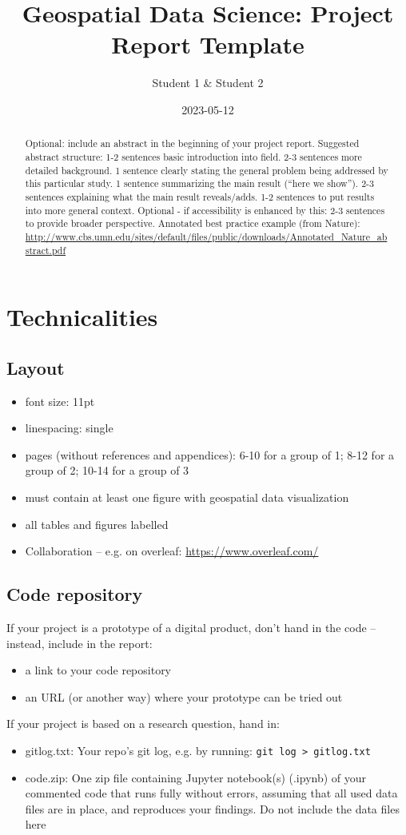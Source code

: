 \documentclass{article}
\title{Geospatial Data Science: Project Report Template}
\author{Student 1 \& Student 2}
\date{2023-05-12}
\begin{document}
\maketitle

\begin{abstract}
Optional: include an abstract in the beginning of your project report. Suggested abstract structure: 1-2 sentences basic introduction into field. 2-3 sentences more detailed background. 1 sentence clearly stating the general problem being addressed by this particular study. 1 sentence summarizing the main result (“here we show”). 2-3 sentences explaining what the main result reveals/adds. 1-2 sentences to put results into more general context. Optional - if accessibility is enhanced by this: 2-3 sentences to provide broader perspective. Annotated best practice example (from Nature): \url{http://www.cbs.umn.edu/sites/default/files/public/downloads/Annotated_Nature_abstract.pdf}
\end{abstract}

\section*{Technicalities}
\subsection*{Layout}
\begin{itemize}
	\item font size: 11pt
	\item linespacing: single
	\item pages (without references and appendices): 6-10 for a group of 1; 8-12 for a group of 2; 10-14 for a group of 3
	\item must contain at least one figure with geospatial data visualization
\item all tables and figures labelled
\item Collaboration – e.g. on overleaf: \url{ https://www.overleaf.com/}
\end{itemize}
\subsection*{Code repository}
If your project is a prototype of a digital product, don’t hand in the code – instead, include in the report:
\begin{itemize}
	\item a link to your code repository 
	\item an URL (or another way) where your prototype can be tried out
\end{itemize}
If your project is based on a research question, hand in:
\begin{itemize}
\item gitlog.txt: Your repo’s git log, e.g. by running: \texttt{git log > gitlog.txt}
 	\item code.zip: One zip file containing Jupyter notebook(s) (.ipynb) of your commented code that runs fully without errors, assuming that all used data files are in place, and reproduces your findings. Do not include the data files here
\end{itemize}
\end{document}

